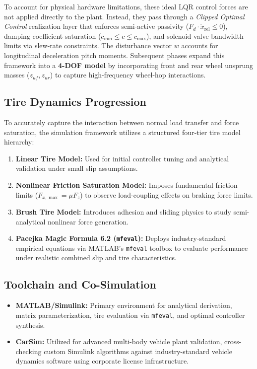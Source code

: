 \documentclass[11pt,a4paper]{article}
\begin{document}
To account for physical hardware limitations, these ideal LQR control forces are not applied directly to the plant. Instead, they pass through a \textit{Clipped Optimal Control} realization layer that enforces semi-active passivity ($F_d \cdot \dot{x}_{\text{rel}} \le 0$), damping coefficient saturation ($c_{\min} \le c \le c_{\max}$), and solenoid valve bandwidth limits via slew-rate constraints. The disturbance vector $w$ accounts for longitudinal deceleration pitch moments. Subsequent phases expand this framework into a \textbf{4-DOF model} by incorporating front and rear wheel unsprung masses ($z_{uf}, z_{ur}$) to capture high-frequency wheel-hop interactions.

\subsection{Tire Dynamics Progression}
To accurately capture the interaction between normal load transfer and force saturation, the simulation framework utilizes a structured four-tier tire model hierarchy:
\begin{enumerate}
    \item \textbf{Linear Tire Model:} Used for initial controller tuning and analytical validation under small slip assumptions.
    \item \textbf{Nonlinear Friction Saturation Model:} Imposes fundamental friction limits ($F_{x,\max} = \mu F_z$) to observe load-coupling effects on braking force limits.
    \item \textbf{Brush Tire Model:} Introduces adhesion and sliding physics to study semi-analytical nonlinear force generation.
    \item \textbf{Pacejka Magic Formula 6.2 (\texttt{mfeval}):} Deploys industry-standard empirical equations via MATLAB's \texttt{mfeval} toolbox to evaluate performance under realistic combined slip and tire characteristics.
\end{enumerate}

\subsection{Toolchain and Co-Simulation}
\begin{itemize}
    \item \textbf{MATLAB/Simulink:} Primary environment for analytical derivation, matrix parameterization, tire evaluation via \texttt{mfeval}, and optimal controller synthesis.
    \item \textbf{CarSim:} Utilized for advanced multi-body vehicle plant validation, cross-checking custom Simulink algorithms against industry-standard vehicle dynamics software using corporate license infrastructure.
\end{itemize}
\end{document}
